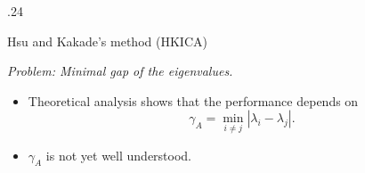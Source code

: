 \documentclass[final]{beamer} %
\begin{document}
\begin{frame}[c]
\begin{columns}[t,totalwidth=\textwidth]
\begin{column} {.24\textwidth}
\begin{block}{Hsu and Kakade's method (HKICA)}
\begin{figure}
\begin{algorithmic}[1]
			\end{algorithmic}
			\end{figure}
			\vspace{1cm}
			{\it\large{Problem: Minimal gap of the eigenvalues.}}
			\begin{itemize}
				\item Theoretical analysis shows that the performance depends on 
					\[
					\gamma_A = \min_{i\neq j} \left\vert \lambda_i - \lambda_j\right \vert.
					\]
				\vspace{-1cm}
				\item $\gamma_A$ is not yet well understood.
			\end{itemize}
		\end{block}
	\end{column}


\end{columns}
\end{frame}
\end{document}
